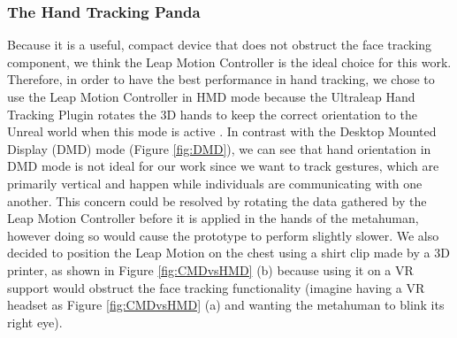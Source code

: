 \subsubsection{The Hand Tracking Panda}
Because it is a useful, compact device that does not obstruct the face tracking component, we think the Leap Motion Controller is the ideal choice for this work. Therefore, in order to have the best performance in hand tracking, we chose to use the Leap Motion Controller in HMD mode because the Ultraleap Hand Tracking Plugin rotates the 3D hands to keep the correct orientation to the Unreal world when this mode is active \cite{ULTP}. In contrast with the Desktop Mounted Display (DMD) mode (Figure \ref{fig:DMD}), we can see that hand orientation in DMD mode is not ideal for our work since we want to track gestures, which are primarily vertical and happen while individuals are communicating with one another. This concern could be resolved by rotating the data gathered by the Leap Motion Controller before it is applied in the hands of the metahuman, however doing so would cause the prototype to perform slightly slower. We also decided to position the Leap Motion on the chest using a shirt clip made by a 3D printer, as shown in Figure \ref{fig:CMDvsHMD} (b) because using it on a VR support would obstruct the face tracking functionality (imagine having a VR headset as Figure \ref{fig:CMDvsHMD} (a) and wanting the metahuman to blink its right eye).

